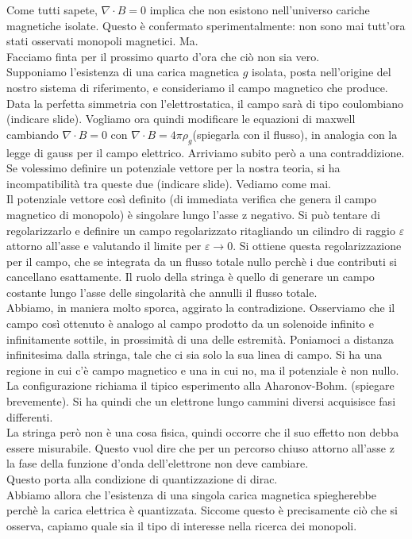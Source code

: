 \documentclass{report}
\begin{document}
Come tutti sapete, $\nabla \cdot B = 0$ implica che non esistono nell'universo
cariche magnetiche isolate. Questo è confermato sperimentalmente: non sono mai tutt'ora
stati osservati monopoli magnetici. Ma.\\
Facciamo finta per il prossimo quarto d'ora che ciò non sia vero.\\

Supponiamo l'esistenza di una carica magnetica $g$ isolata, posta nell'origine
del nostro sistema di riferimento, e consideriamo il campo magnetico che produce.
Data la perfetta simmetria con l'elettrostatica, il campo sarà di tipo coulombiano
(indicare slide). Vogliamo ora quindi modificare le equazioni di maxwell
cambiando $\nabla \cdot B = 0$ con $\nabla \cdot B = 4\pi\rho_g$(spiegarla con il flusso),
in analogia
con la legge di gauss per il campo elettrico. Arriviamo subito però a una contraddizione.\\
Se volessimo definire un potenziale vettore per la nostra teoria, si ha incompatibilità
tra queste due (indicare slide). Vediamo come mai.\\

Il potenziale vettore così definito (di immediata verifica che genera
il campo magnetico di monopolo) è singolare lungo l'asse z negativo. Si può
tentare di regolarizzarlo e definire un campo regolarizzato ritagliando
un cilindro di raggio $\varepsilon$ attorno all'asse e valutando il limite per
$\varepsilon \to 0$. Si ottiene questa regolarizzazione per il campo, che se integrata
da un flusso totale nullo perchè i due contributi si cancellano esattamente.
Il ruolo della stringa è quello di generare un campo costante lungo l'asse delle
singolarità che annulli il flusso totale.\\
Abbiamo, in maniera molto sporca, aggirato la contradizione. Osserviamo che il campo
così ottenuto è analogo al campo prodotto da un solenoide infinito e infinitamente
sottile, in prossimità di una delle estremità.
Poniamoci a distanza infinitesima dalla stringa, tale che ci sia solo la sua linea
di campo. Si ha una regione in cui c'è campo magnetico e una in cui no, ma il potenziale
è non nullo. La configurazione richiama il tipico esperimento alla Aharonov-Bohm.
(spiegare brevemente). Si ha quindi che un elettrone lungo cammini diversi acquisisce
fasi differenti. \\
La stringa però non è una cosa fisica, quindi occorre che il suo effetto non debba
essere misurabile. Questo vuol dire che per un percorso chiuso attorno all'asse z
la fase della funzione d'onda dell'elettrone non deve cambiare.\\
Questo porta alla condizione di quantizzazione di dirac. \\
Abbiamo allora che l'esistenza di una singola carica magnetica spiegherebbe perchè
la carica elettrica è quantizzata. Siccome questo è precisamente ciò che si osserva,
capiamo quale sia il tipo di interesse nella ricerca dei monopoli.\\
\end{document}
